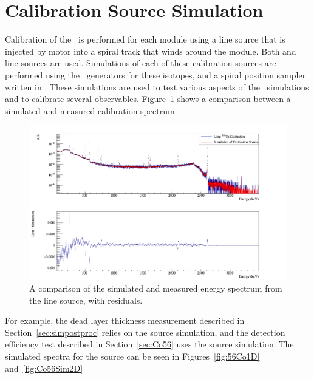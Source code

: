\documentclass[/main.tex]{subfiles}
\begin{document}
\section{Calibration Source Simulation} \label{sec:calsims}
Calibration of the \MJD\ is performed for each module using a line source that is injected by motor into a spiral track that winds around the module.
Both  and  line sources are used.
Simulations of each of these calibration sources are performed using the \geant\ generators for these isotopes, and a spiral position sampler written in \Mage.
These simulations are used to test various aspects of the \Mage\ simulations and to calibrate several observables.
Figure~\ref{fig:228Thsim} shows a comparison between a simulated and measured  calibration spectrum.
\begin{figure}
  \centering
  \includegraphics[width=\textwidth]{Th228CalSim}
  \caption[Comparison of simulated and measured  calibration spectrum]{\label{fig:228Thsim}
    A comparison of the simulated and measured energy spectrum from the  line source, with residuals.
  }
\end{figure}
For example, the dead layer thickness measurement described in Section~\ref{sec:simpostproc} relies on the  source simulation, and the detection efficiency test described in Section~\ref{sec:Co56} uses the  source simulation.
The simulated spectra for the  source can be seen in Figures~\ref{fig:56Co1D} and~\ref{fig:Co56Sim2D}
\end{document}
